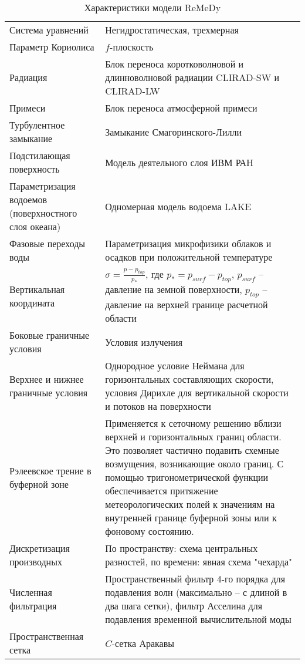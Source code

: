 \documentclass[12pt,a4paper]{report}
\begin{document}
\renewcommand{\arraystretch}{2}
\begin{table}
\centering
\caption{Характеристики модели ReMeDy}
\label{tab:model}
\small
\begin{tabu} to \textwidth {X[l]X[l]}
\toprule
Система уравнений & Негидростатическая, трехмерная \\
Параметр Кориолиса & $f$-плоскость \\
Радиация & Блок переноса коротковолновой и длинноволновой радиации CLIRAD-SW и CLIRAD-LW \\
Примеси & Блок переноса атмосферной примеси \citep{StepanenkoMikushin2008} \\
Турбулентное замыкание	& Замыкание Смагоринского-Лилли \\
Подстилающая поверхность & Модель деятельного слоя ИВМ РАН \\
Параметризация водоемов (поверхностного слоя океана)	& Одномерная модель водоема LAKE \\
Фазовые переходы воды & Параметризация микрофизики облаков и осадков при положительной температуре \\
Вертикальная координата & $\sigma=\frac{p-p_{top}}{p_*}$, где $p_*=p_{surf}-p_{top}$, $p_{surf}$ -- давление на земной поверхности, $p_{top}$ -- давление на верхней границе расчетной области \\
Боковые граничные условия & Условия излучения \\
Верхнее и нижнее граничные условия & Однородное условие Неймана для горизонтальных составляющих скорости, условия Дирихле для вертикальной скорости и потоков на поверхности \\
Рэлеевское трение в буферной зоне & Применяется к сеточному решению вблизи верхней и горизонтальных границ области. Это позволяет частично подавить схемные возмущения, возникающие около границ. С помощью тригонометрической функции обеспечивается притяжение метеорологических полей к значениям на внутренней границе буферной зоны или к фоновому состоянию. \\
Дискретизация производных & По пространству: схема центральных разностей, по времени: явная схема "чехарда" \\
Численная фильтрация & Пространственный фильтр 4-го порядка для подавления волн (максимально – с длиной в два шага сетки), фильтр Асселина для подавления временной вычислительной моды \\
Пространственная сетка & $C$-сетка Аракавы \\
\bottomrule
\end{tabu}
\end{table}
\end{document}
